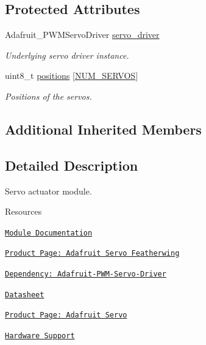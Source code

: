 \subsection*{Protected Attributes}
\begin{DoxyCompactItemize}
\item 
Adafruit\+\_\+\+P\+W\+M\+Servo\+Driver \hyperlink{class_loom___servo_ad002c8ffd5282b4e5b6127fc2c058e9f}{servo\+\_\+driver}
\begin{DoxyCompactList}\small\item\em Underlying servo driver instance. \end{DoxyCompactList}\item 
uint8\+\_\+t \hyperlink{class_loom___servo_a6e278d382b0a2fd1762b2062921c5fa1}{positions} \mbox{[}\hyperlink{_servo_8h_a4ad670f00edea29150a5303b470c5385}{N\+U\+M\+\_\+\+S\+E\+R\+V\+OS}\mbox{]}
\begin{DoxyCompactList}\small\item\em Positions of the servos. \end{DoxyCompactList}\end{DoxyCompactItemize}
\subsection*{Additional Inherited Members}


\subsection{Detailed Description}
Servo actuator module. 

\begin{DoxyParagraph}{Resources}

\begin{DoxyItemize}
\item \href{https://openslab-osu.github.io/Loom/html/class_loom___servo.html}{\tt Module Documentation}
\item \href{https://www.adafruit.com/product/2928}{\tt Product Page\+: Adafruit Servo Featherwing}
\item \href{https://github.com/adafruit/Adafruit-PWM-Servo-Driver-Library}{\tt Dependency\+: Adafruit-\/\+P\+W\+M-\/\+Servo-\/\+Driver}
\item \href{https://cdn-shop.adafruit.com/datasheets/PCA9685.pdf}{\tt Datasheet}
\item \href{https://www.adafruit.com/product/169}{\tt Product Page\+: Adafruit Servo}
\item \href{https://github.com/OPEnSLab-OSU/Loom/wiki/Hardware-Support#servos-8-channel-pwm-or-servo-featherwing}{\tt Hardware Support} 
\end{DoxyItemize}
\end{DoxyParagraph}


